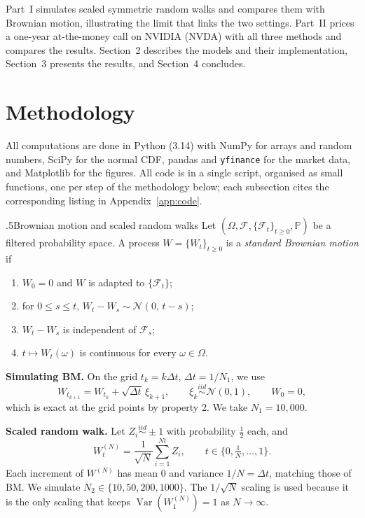 \documentclass[12pt]{amsart}
\makeatletter
\def\subsection{\@startsection{subsection}{2}{\z@}{.7\linespacing\@plus\linespacing}%
  {.5\linespacing}{\normalfont\bfseries}}
\newcommand{\PP}{\mathbb{P}}
\newcommand{\N}{\mathcal{N}}
\makeatother
\begin{document}
Part~I simulates scaled symmetric random walks and compares them with Brownian motion,
illustrating the limit that links the two settings. Part~II prices a one-year at-the-money call
on NVIDIA (NVDA) with all three methods and compares the results. Section~2 describes the models
and their implementation, Section~3 presents the results, and Section~4 concludes. 


\section{Methodology}
All computations are done in Python (3.14) with NumPy for arrays and random numbers, SciPy for
the normal CDF, pandas and \texttt{yfinance} for the market data, and Matplotlib for the figures.
All code is in a single script, organised as small functions, one per step of the methodology
below; each subsection cites the corresponding listing in Appendix~\ref{app:code}.

\subsection{Brownian motion and scaled random walks}
Let $(\Omega,\mathcal F,\{\mathcal F_t\}_{t\ge 0},\PP)$ be a filtered probability space.
A process $W=\{W_t\}_{t\ge0}$ is a \emph{standard Brownian motion} if
\begin{enumerate}
  \item $W_0=0$ and $W$ is adapted to $\{\mathcal F_t\}$;
  \item for $0\le s\le t$, $W_t-W_s\sim\N(0,\,t-s)$;
  \item $W_t-W_s$ is independent of $\mathcal F_s$;
  \item $t\mapsto W_t(\omega)$ is continuous for every $\omega\in\Omega$.
\end{enumerate}

\noindent\textbf{Simulating BM.} On the grid $t_k=k\Delta t$, $\Delta t=1/N_1$, we use
\begin{equation}\label{eq:bm_scheme}
W_{t_{k+1}} = W_{t_k} + \sqrt{\Delta t}\,\xi_{k+1},\qquad \xi_k \overset{iid}{\sim}\N(0,1),\qquad W_0=0,
\end{equation}
which is exact at the grid points by property 2. We take $N_1=10{,}000$.

\noindent\textbf{Scaled random walk.} Let $Z_i\overset{iid}{\sim}\pm1$ with probability $\tfrac12$ each, and
\begin{equation}\label{eq:srw}
W^{(N)}_t = \frac{1}{\sqrt N}\sum_{i=1}^{Nt} Z_i,\qquad t\in\{0,\tfrac1N,\dots,1\}.
\end{equation}
Each increment of $W^{(N)}$ has mean $0$ and variance $1/N=\Delta t$, matching those of BM.
We simulate $N_2\in\{10,50,200,1000\}$. The $1/\sqrt N$ scaling is used because it is the only scaling that keeps
$\operatorname{Var}(W^{(N)}_1)=1$ as $N\to\infty$.
\end{document}

